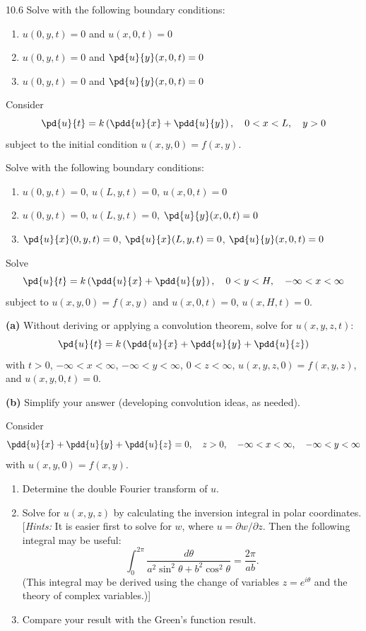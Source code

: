 \begin{exercises}{10.6}
Solve with the following boundary conditions:
\begin{enumerate}
\item[\starred (a)] $u(0,y,t) = 0$ and $u(x,0,t) = 0$
\item[(b)] $u(0,y,t) = 0$ and $\pd{u}{y}(x,0,t) = 0$
\item[(c)] $u(0,y,t) = 0$ and $\pd{u}{y}(x,0,t) = 0$
\end{enumerate}

\item Consider
\[
\pd{u}{t} = k\left(\pdd{u}{x}+\pdd{u}{y}\right), \quad 0 < x < L, \quad y > 0
\]
subject to the initial condition $u(x,y,0) = f(x,y)$.

Solve with the following boundary conditions:
\begin{enumerate}
\item[\starred (a)] $u(0,y,t) = 0$, \quad $u(L,y,t) = 0$, \quad $u(x,0,t) = 0$
\item[(b)] $u(0,y,t) = 0$, \quad $u(L,y,t) = 0$, \quad $\pd{u}{y}(x,0,t) = 0$
\item[(c)] $\pd{u}{x}(0,y,t) = 0$, \quad $\pd{u}{x}(L,y,t) = 0$, \quad $\pd{u}{y}(x,0,t) = 0$
\end{enumerate}

\item Solve
\[
\pd{u}{t} = k\left(\pdd{u}{x}+\pdd{u}{y}\right), \quad 0 < y < H, \quad -\infty < x < \infty
\]
subject to $u(x,y,0) = f(x,y)$ and $u(x,0,t) = 0$, $u(x,H,t) = 0$.

\item \textbf{(a)} Without deriving or applying a convolution theorem, solve for $u(x,y,z,t)$:
\[
\pd{u}{t} = k\left(\pdd{u}{x}+\pdd{u}{y}+\pdd{u}{z}\right)
\]
with $t > 0$, $-\infty < x < \infty$, $-\infty < y < \infty$, $0 < z < \infty$, $u(x,y,z,0) = f(x,y,z)$, and $u(x,y,0,t) = 0$.

\textbf{(b)} Simplify your answer (developing convolution ideas, as needed).

\item Consider
\[
\pdd{u}{x}+\pdd{u}{y}+\pdd{u}{z}=0, \quad z > 0, \quad -\infty < x < \infty, \quad -\infty < y < \infty
\]
with $u(x,y,0) = f(x,y)$.
\begin{enumerate}
\item[\starred (a)] Determine the double Fourier transform of $u$.
\item[\starred (b)] Solve for $u(x,y,z)$ by calculating the inversion integral in polar coordinates.  [\textit{Hints:} It is easier first to solve for $w$, where $u = \partial w/\partial z$.  Then the following integral may be useful:
\[
\int_0^{2\pi}\frac{d\theta}{a^2\sin^2\theta+b^2\cos^2\theta} = \frac{2\pi}{ab}.
\]
(This integral may be derived using the change of variables $z = e^{i\theta}$ and the theory of complex variables.)]
\item[(c)] Compare your result with the Green's function result.
\end{enumerate}


\end{exercises}
